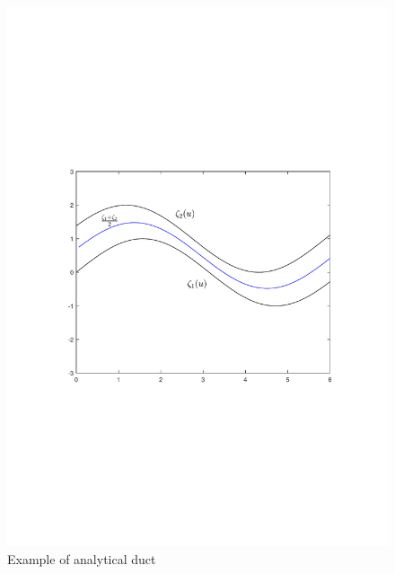 \documentclass[12pt,a4]{article}
\begin{document}
\begin{figure}[h]
\centering
\includegraphics[scale=0.75]{figures/fig11.pdf}
\caption{ Example of analytical duct \label{fig:analyticduct}}
\end{figure}
\end{document}
